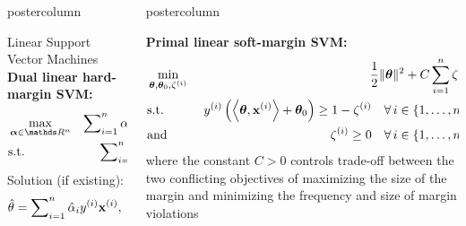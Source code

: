 \documentclass{beamer}
\newlength{\columnheight} %
\begin{document}
\begin{frame}[fragile]{}
\begin{columns}
\begin{column}{.31\textwidth}
\begin{beamercolorbox}[center]{postercolumn}
\begin{minipage}{.98\textwidth}
{\begin{myblock}{Linear Support Vector Machines}
	\textbf{Dual linear hard-margin SVM:}
	\begin{eqnarray*}
		& \max\limits_{\alphav \in \R^n} & \sum\nolimits_{i=1}^n \alpha_i - \frac{1}{2}\sum\nolimits_{i=1}^n\sum\nolimits_{j=1}^n\alpha_i\alpha_j\yi y^{(j)} \scp{\xi}{\xv^{(j)}} \\
		& \text{s.t.} & \sum\nolimits_{i=1}^n \alpha_i \yi = 0, 
		 \quad \text{and} \quad \alpha_i \ge 0~\forall i \in \nset
	\end{eqnarray*}
	Solution (if existing):
	$$
	\hat{\theta} = \sum\nolimits_{i=1}^n \hat \alpha_i y^{(i)} \mathbf{x}^{(i)}, \quad \theta_0 = y^{(i)} - \left\langle \bm{\theta}, \mathbf{x}^{(i)} \right\rangle.
	$$
\end{myblock}


 
				}
			\end{minipage}
		\end{beamercolorbox}
	\end{column}
	\begin{column}{.31\textwidth}
		\begin{beamercolorbox}[center]{postercolumn}
			\begin{minipage}{.98\textwidth}
				\parbox[t][\columnheight]{\textwidth}{


\begin{myblock}{} \vspace{-4ex}
%	
	\textbf{Primal linear soft-margin SVM:} 	
	\begin{eqnarray*}
		& \min\limits_{\bm{\theta}, \bm{\theta}_0,\zeta^{(i)}} & \frac{1}{2} \|\bm{\theta}\|^2 + C   \sum_{i=1}^n \zeta^{(i)} \\
		& \text{s.t.} & \,\, y^{(i)}  \left( \left\langle \bm{\theta}, \mathbf{x}^{(i)} \right\rangle + \bm{\theta}_0 \right) \geq 1 - \zeta^{(i)} \quad \forall\, i \in \{1, \ldots, n\},\\
		& \text{and} & \,\, \zeta^{(i)} \geq 0 \quad \forall\, i \in \{1, \ldots, n\},\\
	\end{eqnarray*}
%
	where the constant $C > 0$ controls trade-off between the two conflicting
	objectives of maximizing the size of the margin and minimizing the
	frequency and size of margin violations\\
	

\end{myblock}}
\end{minipage}
\end{beamercolorbox}
\end{column}
\end{columns}
\end{frame}
\end{document}
